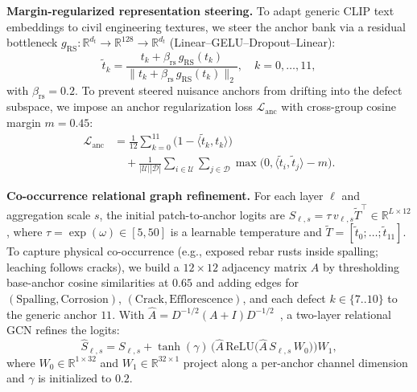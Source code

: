 \documentclass[conference]{IEEEtran}
\begin{document}
\textbf{Margin-regularized representation steering.} To adapt generic CLIP text embeddings to civil engineering textures, we steer the anchor bank via a residual bottleneck $g_{\mathrm{RS}}: \mathbb{R}^{d_t} \to \mathbb{R}^{128} \to \mathbb{R}^{d_t}$ (Linear--GELU--Dropout--Linear):
\begin{equation}
\tilde{t}_k = \frac{t_k + \beta_{\mathrm{rs}}\, g_{\mathrm{RS}}(t_k)}{\lVert t_k + \beta_{\mathrm{rs}}\, g_{\mathrm{RS}}(t_k) \rVert_2}, \quad k = 0, \dots, 11,
\end{equation}
with $\beta_{\mathrm{rs}}{=}0.2$. To prevent steered nuisance anchors from drifting into the defect subspace, we impose an anchor regularization loss $\mathcal{L}_{\mathrm{anc}}$ with cross-group cosine margin $m{=}0.45$:
\begin{align}
\mathcal{L}_{\mathrm{anc}} &= \frac{1}{12}\sum_{k=0}^{11}\big(1 - \langle \tilde{t}_k, t_k \rangle\big) \nonumber \\
&\quad + \frac{1}{|\mathcal{U}||\mathcal{D}|}\sum_{i \in \mathcal{U}}\sum_{j \in \mathcal{D}} \max\big(0, \langle \tilde{t}_i, \tilde{t}_j \rangle - m\big).
\end{align}

\textbf{Co-occurrence relational graph refinement.} For each layer $\ell$ and aggregation scale $s$, the initial patch-to-anchor logits are $S_{\ell,s} = \tau\, v_{\ell,s} \tilde{T}^\top \in \mathbb{R}^{L \times 12}$, where $\tau = \exp(\omega) \in [5, 50]$ is a learnable temperature and $\tilde{T} = [\tilde{t}_0; \dots; \tilde{t}_{11}]$. To capture physical co-occurrence (e.g., exposed rebar rusts inside spalling; leaching follows cracks), we build a $12{\times}12$ adjacency matrix $A$ by thresholding base-anchor cosine similarities at $0.65$ and adding edges for $(\text{Spalling}, \text{Corrosion})$, $(\text{Crack}, \text{Efflorescence})$, and each defect $k \in \{7..10\}$ to the generic anchor $11$. With $\hat{A} = D^{-1/2}(A + I)D^{-1/2}$~\cite{kipf2017gcn}, a two-layer relational GCN refines the logits:
\begin{equation}
\hat{S}_{\ell,s} = S_{\ell,s} + \tanh(\gamma)\, \Big(\hat{A}\, \mathrm{ReLU}\big(\hat{A}\, S_{\ell,s}\, W_0\big)\Big) W_1,
\end{equation}
where $W_0 \in \mathbb{R}^{1 \times 32}$ and $W_1 \in \mathbb{R}^{32 \times 1}$ project along a per-anchor channel dimension and $\gamma$ is initialized to $0.2$.
\end{document}

